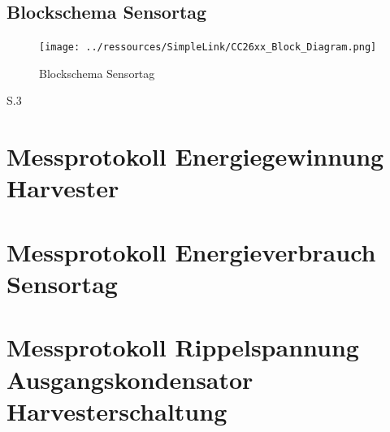 \section{Blockschema Sensortag}

\begin{figure}[h]
    \texttt{[image: ../ressources/SimpleLink/CC26xx\_Block\_Diagram.png]} 
     \caption{Blockschema Sensortag}
\end{figure}

\cite{Sensortag_Datasheet}S.3


\chapter{Messprotokoll Energiegewinnung Harvester}\label{anhang_messprotokoll_energie_harvester} 



\chapter{Messprotokoll Energieverbrauch Sensortag}\label{anhang_messprotokoll_energie_sensortag} 
%

\chapter{Messprotokoll Rippelspannung Ausgangskondensator Harvesterschaltung}\label{anhang_messprotokoll_kondensator_harvester} 
